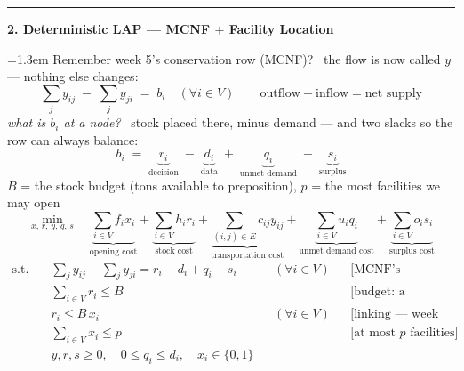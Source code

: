 \documentclass[10pt]{article}
\newcommand{\beat}[2]{%
  \par\medskip\needspace{8\baselineskip}%
  {\color{ruleink}\rule{\textwidth}{1pt}}\par\nobreak\vspace{2pt}
  {\large\bfseries #1.\; #2}\par\nobreak\vspace{3pt}}
\newenvironment{board}{%
  \par\vspace{2pt}
  \begingroup\leftskip=1.3em\relax}{%
  \par\endgroup\vspace{2pt}}
\begin{document}
\beat{2}{Deterministic LAP --- MCNF $+$ Facility Location}
\begin{board}
Remember week 5's conservation row (MCNF)? \ the flow is now called $y$ --- nothing else changes:
\[
  \textstyle\sum_{j} y_{ij} \;-\; \sum_{j} y_{ji} \;=\; b_i \quad (\forall i \in V)
  \qquad \text{outflow} - \text{inflow} = \text{net supply}
\]
\emph{what is $b_i$ at a node?} \ stock placed there, minus demand --- and two slacks so the row can always balance:
\[
  b_i \;=\; \underbrace{r_i}_{\text{decision}} \;-\; \underbrace{d_i}_{\text{data}}
  \;+\; \underbrace{q_i}_{\text{unmet demand}} \;-\; \underbrace{s_i}_{\text{surplus}}
\]
$B$ = the stock budget (tons available to preposition), \quad $p$ = the most facilities we may open
\[
  \min_{x,\,r,\,y,\,q,\,s}\quad
  \underbrace{\textstyle\sum_{i \in V} f_i x_i}_{\text{opening cost}}
  + \underbrace{\textstyle\sum_{i \in V} h_i r_i}_{\text{stock cost}}
  + \underbrace{\textstyle\sum_{(i,j) \in E} c_{ij} y_{ij}}_{\text{transportation cost}}
  + \underbrace{\textstyle\sum_{i \in V} u_i q_i}_{\text{unmet demand cost}}
  + \underbrace{\textstyle\sum_{i \in V} o_i s_i}_{\text{surplus cost}}
\]
\vspace{-2pt}
\[
\begin{aligned}
  \text{s.t.}\quad
    & \textstyle\sum_{j} y_{ij} - \sum_{j} y_{ji} = r_i - d_i + q_i - s_i && (\forall i \in V) && \text{[MCNF's conservation]} \\
    & \textstyle\sum_{i \in V} r_i \le B && && \text{[budget: a knapsack row]} \\
    & r_i \le B\, x_i && (\forall i \in V) && \text{[linking --- week 2]} \\
    & \textstyle\sum_{i \in V} x_i \le p && && \text{[at most $p$ facilities]} \\
    & y, r, s \ge 0, \quad 0 \le q_i \le d_i, \quad x_i \in \{0,1\}
\end{aligned}
\]
\end{board}
\end{document}
